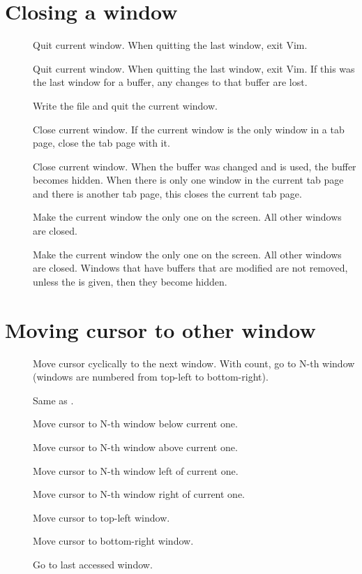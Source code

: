 \section{Closing a window}
\begin{description}
  \item[] Quit current window. When quitting the last window, exit Vim.
  \item[] Quit current window. When quitting the last window, exit Vim. If this was the last window for a buffer, any changes to that buffer are lost.
  \item[] Write the file and quit the current window.
  \item[] Close current window. If the current window is the only window in a tab page, close the tab page with it.
  \item[] Close current window. When the buffer was changed and \syntax{[!]} is used, the buffer becomes hidden. When there is only one window in the current tab page and there is another tab page, this closes the current tab page.
  \item[] Make the current window the only one on the screen. All other windows are closed.
  \item[] Make the current window the only one on the screen. All other windows are closed. Windows that have buffers that are modified are not removed, unless the \syntax{[!]} is given, then they become hidden.
\end{description}
\section{Moving cursor to other window}
\begin{description}
  \item[] Move cursor cyclically to the next window. With count, go to N-th window (windows are numbered from top-left to bottom-right).
  \item[] Same as .
  \item[] Move cursor to N-th window below current one.
  \item[] Move cursor to N-th window above current one.
  \item[] Move cursor to N-th window left of current one.
  \item[] Move cursor to N-th window right of current one.
  \item[] Move cursor to top-left window.
  \item[] Move cursor to bottom-right window.
  \item[] Go to last accessed window.
\end{description}
